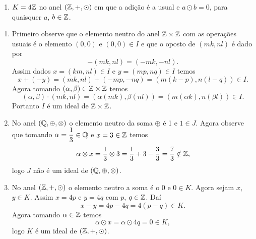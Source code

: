 \begin{exemplo}
\begin{enumerate}[label={\arabic*})]
\begin{enumerate}[label=({\alph*})]
                \item $K = 4\mathbb{Z}$ no anel $(\mathbb{Z}, +, \odot)$ em que a adi\c{c}\~ao \'e a usual e $a \odot b = 0$, para quaisquer $a$, $b \in \mathbb{Z}$.
            \end{enumerate}
            \begin{solucao}
                \begin{enumerate}[label=({\alph*})]
                    \item Primeiro observe que o elemento neutro do anel $\mathbb{Z} \times \mathbb{Z}$ com as operações usuais é o elemento $(0, 0)$ e $(0, 0) \in I$ e que o oposto de $(mk, nl)$
                        é dado por
                        \[
                            -(mk, nl) = (-mk, -nl).
                        \]
                        Assim dados $x = (km, nl) \in I$ e $y = (mp, nq) \in I$ temos
                        \[
                            x + (-y) = (mk, nl) + (-mp, -nq) = (m(k - p), n(l - q)) \in I.
                        \]
                        Agora tomando $(\alpha, \beta) \in \mathbb{Z} \times \mathbb{Z}$ temos
                        \[
                            (\alpha, \beta) \cdot (mk, nl) = (\alpha(mk), \beta(nl)) = (m(\alpha k), n(\beta l)) \in I.
                        \]
                        Portanto $I$ é um ideal de $\mathbb{Z} \times \mathbb{Z}$.

                    \item No anel $(\mathbb{Q}, \oplus, \otimes)$ o elemento neutro da soma $\oplus$ é 1 e $1 \in J$. Agora observe que tomando $\alpha = \dfrac{1}{3} \in \mathbb{Q}$ e $x =
                        3 \in \mathbb{Z}$ temos
                        \[
                            \alpha \otimes x = \dfrac{1}{3} \otimes 3 = \dfrac{1}{3} + 3 - \dfrac{3}{3} = \dfrac{7}{3} \notin \mathbb{Z},
                        \]
                        logo $J$ não é um ideal de $(\mathbb{Q}, \oplus, \otimes)$.

                    \item No anel $(\mathbb{Z}, +, \odot)$ o elemento neutro a soma é o 0 e $0 \in K$. Agora sejam $x$, $y \in K$. Assim $x = 4p$ e $y = 4q$ com $p$, $q \in \mathbb{Z}$. Daí
                        \[
                            x - y = 4p - 4q = 4(p - q) \in K.
                        \]
                        Agora tomando $\alpha \in \mathbb{Z}$ temos
                        \[
                            \alpha \odot x = \alpha \odot 4q = 0 \in K,
                        \]
                        logo $K$ é um ideal de $(\mathbb{Z}, +, \odot)$.
                \end{enumerate}
            \end{solucao}
    \end{enumerate}
\end{exemplo}

